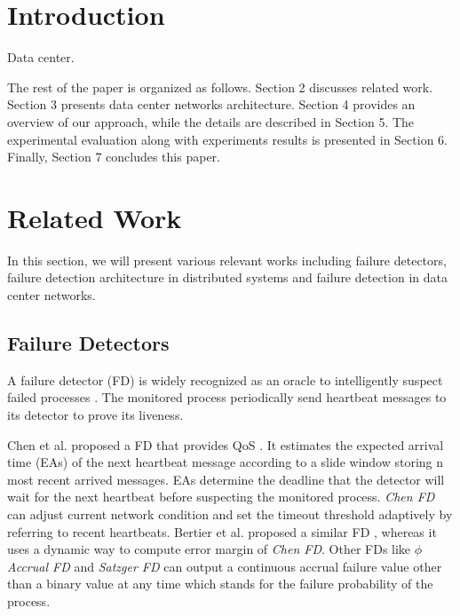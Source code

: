 \documentclass{sig-alternate-05-2015}
\begin{document}
%
%

%
%
\printccsdesc



\section{Introduction}
Data center.

The rest of the paper is organized as follows. Section 2 discusses related work. Section 3 presents data center networks architecture. Section 4 provides an overview of our approach, while the details are described in Section 5. The experimental evaluation along with experiments results is presented in Section 6. Finally, Section 7 concludes this paper.

\section{Related Work}
In this section, we will present various relevant works including failure detectors, failure detection architecture in distributed systems and failure detection in data center networks.

\subsection{Failure Detectors}
A failure detector (FD) is widely recognized as an oracle to intelligently suspect failed processes \cite{chandra1996unreliable}. The monitored process periodically send heartbeat messages to its detector to prove its liveness.

Chen et al. proposed a FD that provides QoS \cite{chen2002quality}. It estimates the expected arrival time (EAs) of the next heartbeat message according to a slide window storing n most recent arrived messages. EAs determine the deadline that the detector will wait for the next heartbeat before suspecting the monitored process. \textit{Chen FD} can adjust current network condition and set the timeout threshold adaptively by referring to recent heartbeats. Bertier et al. proposed a similar FD \cite{bertier2002implementation}, whereas it uses a dynamic way to compute error margin of \textit{Chen FD}. Other FDs like \textit{$\phi$ Accrual FD} \cite{hayashibara2004varphi} and \textit{Satzger FD} \cite{satzger2007new} can output a continuous accrual failure value other than a binary value at any time which stands for the failure probability of the process.
\end{document}
